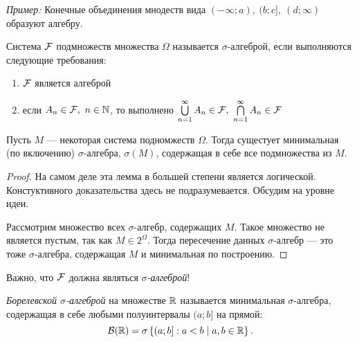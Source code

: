 \begin{itemize}
\begin{definition}
            \textit{Пример:} Конечные объединения мнодеств вида \( (-\infty; a),\ (b; c],\ (d; \infty) \) образуют алгебру.
           
        \end{definition}
    
        \begin{definition}
            Система $ \mathcal{F} $ подмножеств множества $ \Omega $ называется $ \sigma $-алгеброй, если выполняются следующие требования:
            
            \begin{enumerate}
                \item $ \mathcal{F} $ является алгеброй      
                
                \item если \(A_n \in \mathcal{F},\ n \in \mathbb{N} \), то выполнено \(\bigcup\limits_{n = 1}^{\infty}A_n \in \mathcal{F}, \ \bigcap\limits_{n = 1}^{\infty}A_n \in \mathcal{F} \)  
            \end{enumerate}
        
        \end{definition}
    
        \begin{lemma}
            Пусть $ M $ --- некоторая система подномжеств $ \Omega $. Тогда сущестует минимальная (по включению) $ \sigma $-алгебра, $ \sigma(M) $, содержащая в себе все подмножества из $ M $.
        \end{lemma}
    
        \begin{proof}
            На самом деле эта лемма в большей степени является логической. Констуктивного доказательства здесь не подразумевается. Обсудим на уровне идеи.
            
            Рассмотрим множество всех $\sigma$-алгебр, содержащих $ M $. Такое множество не является пустым, так как \(M \in 2^{\Omega}\). Тогда пересечение данных $ \sigma $-алгебр --- это тоже $ \sigma $-алгебра, содержащая $ M $ и минимальная по построению.
        \end{proof}
        
    Важно, что $ \mathcal{F} $ должна являться \emph{$ \sigma $-алгеброй}!
    
        \begin{definition}
            \emph{Борелевской $ \sigma $-алгеброй} на множестве $ \mathbb{R} $ называется минимальная $ \sigma $-алгебра, содержащая в себе любыми полуинтервалы \((a; b] \) на прямой:
            \[
                \mathcal{B}(\mathbb{R}) = \sigma\left\{(a; b] : a < b \mid a, b \in \mathbb{R} \right\}.
            \]
        \end{definition} 
    

\end{itemize}
